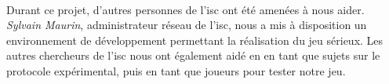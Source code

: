 \paragraph{}Durant ce projet, d'autres personnes de l'\gls{isc} ont été amenées à nous aider. \emph{Sylvain Maurin}, administrateur réseau de l'\gls{isc}, nous a mis à disposition un
environnement de développement permettant la réalisation du jeu sérieux. Les autres chercheurs de l'\gls{isc} nous ont également aidé en en tant que sujets sur le protocole
expérimental, puis en tant que joueurs pour tester notre jeu.
